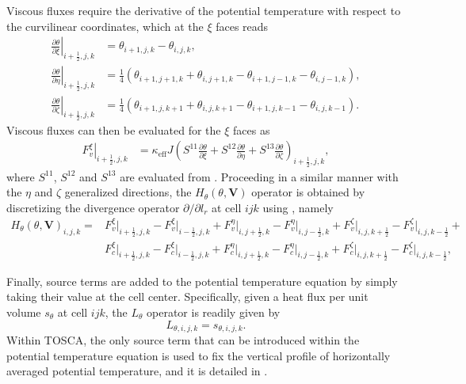 Viscous fluxes require the derivative of the potential temperature with respect to the curvilinear coordinates, which at the $\xi$ faces reads
\begin{align}
	\left.\frac{\partial \theta}{\partial \xi}\right|_{i+\frac{1}{2}, j, k} & =\theta_{i+1, j, k}-\theta_{i, j, k}, \nonumber \\
	\left.\frac{\partial \theta}{\partial \eta}\right|_{i+\frac{1}{2}, j, k} & =\frac{1}{4}\left(\theta_{i+1, j+1, k}+\theta_{i, j+1, k}-\theta_{i+1, j-1, k}-\theta_{i, j-1, k}\right), \nonumber \\
	\left.\frac{\partial \theta}{\partial \zeta}\right|_{i+\frac{1}{2}, j, k} & =\frac{1}{4}\left(\theta_{i+1, j, k+1}+\theta_{i, j, k+1}-\theta_{i+1, j, k-1}-\theta_{i, j, k-1}\right). \nonumber 
\end{align}
Viscous fluxes can then be evaluated for the $\xi$ faces as 
\begin{align}
	\left.F^\xi_{v}\right|_{i+\frac{1}{2}, j, k} & =\kappa_\text{eff} J\left(S^{11} \frac{\partial \theta}{\partial \xi}+S^{12} \frac{\partial \theta}{\partial \eta}+S^{13} \frac{\partial \theta}{\partial \zeta}\right)_{i+\frac{1}{2}, j, k},
	\label{eq:viscousFluxesT}
\end{align}
where $S^{11}$, $S^{12}$ and $S^{13}$ are evaluated from . Proceeding in a similar manner with the $\eta$ and $\zeta$ generalized directions, the $H_\theta(\theta,\mathbf{V})$  operator is obtained by discretizing the divergence operator $\partial/\partial l_r$ at cell $ijk$ using , namely
\begin{align}
	H_\theta(\theta,\mathbf{V})_{i,j,k} = 
	&F^\xi_{v}\bigg|_{i+\frac{1}{2},j,k} - F^\xi_{v}\bigg|_{i-\frac{1}{2},j,k} + 
	F^\eta_{v}\bigg|_{i,j+\frac{1}{2},k} - F^\eta_{v}\bigg|_{i,j-\frac{1}{2},k} + 
	F^\zeta_{v}\bigg|_{i,j,k+\frac{1}{2}} - F^\zeta_{v}\bigg|_{i,j,k-\frac{1}{2}} +
	\nonumber \\
	&F^\xi_{c}\bigg|_{i+\frac{1}{2},j,k} - F^\xi_{c}\bigg|_{i-\frac{1}{2},j,k} + 
	F^\eta_{c}\bigg|_{i,j+\frac{1}{2},k} - F^\eta_{c}\bigg|_{i,j-\frac{1}{2},k} + 
	F^\zeta_{c}\bigg|_{i,j,k+\frac{1}{2}} - F^\zeta_{c}\bigg|_{i,j,k-\frac{1}{2}}, 
\end{align}

Finally, source terms are added to the potential temperature equation by simply taking their value at the cell center. Specifically, given a heat flux per unit volume $s_\theta$ at cell $ijk$, the $L_\theta$ operator is readily given by 
\begin{equation}
	L_{\theta,i,j,k} = s_{\theta,i,j,k}.
\end{equation}
Within TOSCA, the only source term that can be introduced within the potential temperature equation is used to fix the vertical profile of horizontally averaged potential temperature, and it is detailed in .

